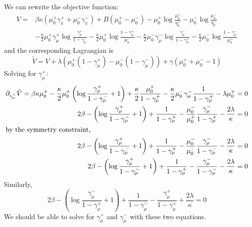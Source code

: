 \documentclass[12pt]{article}
\begin{document}
\newpage
We can rewrite the objective function:
\begin{align*}
    V = & \beta \kappa\left(\mu_0^+\gamma_\pi^+ + \mu_0^-\gamma_\pi^-\right)
    + B\left(\mu_0^+ - \mu_0^-\right)
    - \mu_0^+\log\frac{\mu_0^+}{\eta_0^+} - \mu_0^-\log\frac{\mu_0^-}{\eta_0^-}      \\
        & - \frac\kappa2\mu_0^+\gamma_\mu^+\log\frac{\gamma_\mu^+}{1 - \gamma_\mu^-}
    - \frac\kappa2\mu_0^+\log\frac{1 - \gamma_\mu^+}{\mu_0^-}
    - \frac\kappa2\mu_0^-\gamma_\mu^-\log\frac{\gamma_\mu^-}{1 - \gamma_\mu^+}
    - \frac\kappa2\mu_0^-\log\frac{1 - \gamma_\mu^-}{\mu_0^+}
\end{align*}
and the corresponding Lagrangian is
\begin{equation*}
    \tilde{V} = V + \lambda(\mu_0^+(1-\gamma_\mu^+) - \mu_0^-(1-\gamma_\mu^-)) + \gamma (\mu_0^+ + \mu_0^- - 1)
\end{equation*}
Solving for $\gamma_\mu^+$:
\begin{align*}
    \partial_{\gamma_\mu^+} \tilde{V} = \beta\kappa\mu_0^+ -\frac\kappa2\mu_0^+\left(\log\frac{\gamma_\mu^+}{1-\gamma_\mu^-} + 1\right)
    + \frac\kappa2\frac{\mu_0^+}{1-\gamma_\mu^+} - \frac\kappa2\mu_0^-\gamma_\mu^-\frac{1}{1-\gamma_\mu^+}-\lambda\mu_0^+ & = 0 \\
    2\beta - \left(\log\frac{\gamma_\mu^+}{1-\gamma_\mu^-} + 1\right)
    + \frac{1}{1-\gamma_\mu^+} - \frac{\mu_0^-}{\mu_0^+}\frac{\gamma_\mu^-}{1-\gamma_\mu^+}-\frac{2\lambda}{\kappa}       & = 0 \\
    \intertext{by the symmetry constraint, }
    2\beta - \left(\log\frac{\gamma_\mu^+}{1-\gamma_\mu^-} + 1\right)
    + \frac{1}{1-\gamma_\mu^+} - \frac{\mu_0^-}{\mu_0^-}\frac{\gamma_\mu^-}{1-\gamma_\mu^-}-\frac{2\lambda}{\kappa}       & = 0 \\
    2\beta - \left(\log\frac{\gamma_\mu^+}{1-\gamma_\mu^-} + 1\right)
    + \frac{1}{1-\gamma_\mu^+} - \frac{\gamma_\mu^-}{1-\gamma_\mu^-}-\frac{2\lambda}{\kappa}                              & = 0
\end{align*}
Similarly,
\begin{equation*}
    2\beta - \left(\log\frac{\gamma_\mu^-}{1-\gamma_\mu^+} + 1\right)
    + \frac{1}{1-\gamma_\mu^-} - \frac{\gamma_\mu^+}{1-\gamma_\mu^+}+\frac{2\lambda}{\kappa}= 0
\end{equation*}
We should be able to solve for $\gamma_\mu^+$ and $\gamma_\mu^-$ with these two equations.
\end{document}
